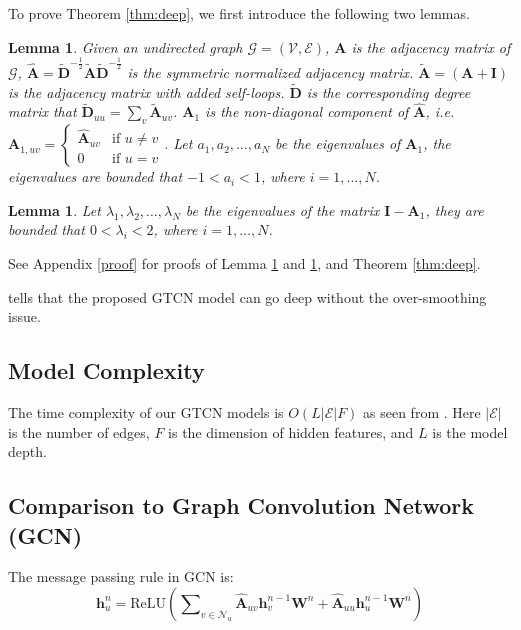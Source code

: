\documentclass[lettersize,journal]{IEEEtran}
\theoremstyle{plain}
\newtheorem{lemma}[theorem]{Lemma}
\theoremstyle{definition}
\theoremstyle{remark}
\begin{document}
To prove Theorem \ref{thm:deep}, we first introduce the following two lemmas.

\begin{lemma}
	\label{lm:eigen1}
	Given an undirected graph $\mathcal{G}=(\mathcal{V,E})$, $\bm{A}$ is the adjacency matrix of $\mathcal{G}$, $\hat{\bm{A}} = \tilde{\bm{D}}^{-\frac{1}{2}} \tilde{\bm{A}} \tilde{\bm{D}}^{-\frac{1}{2}}$ is the symmetric normalized adjacency matrix. $\tilde{\bm{A}} = \left(\bm{A} + \bm{I}\right)$ is the adjacency matrix with added self-loops. $\tilde{\bm{D}}$ is the corresponding degree matrix that $\tilde{\bm{D}}_{uu} = \sum\nolimits_v \tilde{\bm{A}}_{uv}$. $\bm{A}_1$ is the non-diagonal component of $\hat{\bm{A}}$, i.e. 
	$\bm{A}_{1,uv} = \begin{cases}
		\hat{\bm{A}}_{uv} & \text{if $u \neq v$}\\
		0 & \text{if $u = v$}
	\end{cases}$. Let $a_1, a_2, \ldots, a_N$ be the eigenvalues of $\bm{A}_1$, the eigenvalues are bounded that $-1<a_i<1$, where $i=1,\ldots,N$.
\end{lemma}

\begin{lemma}
	\label{lm:eigen2}
	Let $\lambda_1, \lambda_2, \ldots, \lambda_N$ be the eigenvalues of the matrix $\bm{I}-\bm{A}_1$, they are bounded that $0<\lambda_i <2$, where $i=1, \ldots, N$.
\end{lemma}

See Appendix \ref{proof} for proofs of Lemma \ref{lm:eigen1} and \ref{lm:eigen2}, and Theorem \ref{thm:deep}.

 tells that the proposed GTCN model can go deep without the over-smoothing issue.

\subsection{Model Complexity}
The time complexity of our GTCN models is $O(L \lvert \mathcal{E} \rvert F)$ as seen from . Here $\lvert \mathcal{E} \rvert$ is the number of edges, $F$ is the dimension of hidden features, and $L$ is the model depth. 

\subsection{Comparison to Graph Convolution Network (GCN)}
\label{compare:GCN}
The message passing rule in GCN is:
\begin{equation}
	\label{eqn:gcn}
	\bm{h}_u^n = \text{ReLU}\left(\sum\nolimits_{v\in \mathcal{N}_u}{\hat{\bm{A}}_{uv} \bm{h}_v^{n-1}} \bm{W}^n + \hat{\bm{A}}_{uu} \bm{h}_u^{n-1}\bm{W}^n\right)
\end{equation}
\end{document}

